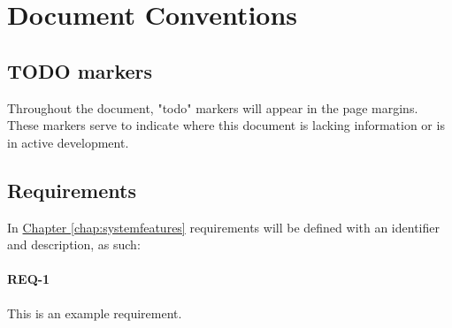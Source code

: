 \section{Document Conventions}\label{sec:document_conventions}

\subsection{TODO markers}
Throughout the document, "todo" markers will appear in the page margins. These
markers serve to indicate where this document is lacking information or is
in active development.



\subsection{Requirements}
In \hyperref[chap:systemfeatures]{Chapter \ref{chap:systemfeatures}}
requirements will be defined with an identifier and description, as such:

\paragraph{REQ-1}
\begin{indentpar}{1cm}
This is an example requirement.
\end{indentpar}


